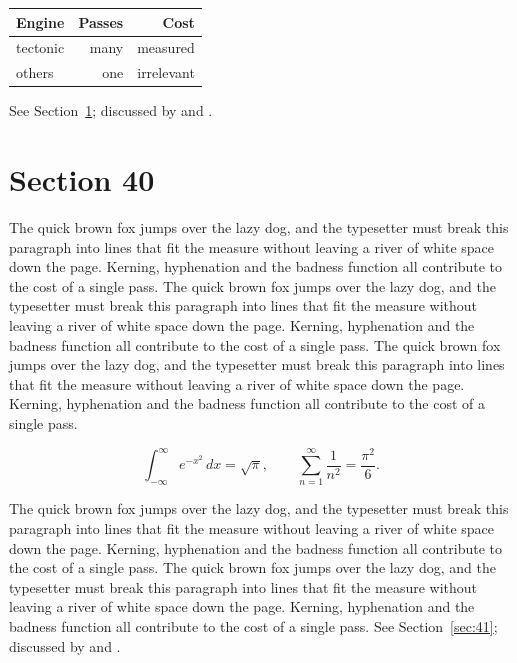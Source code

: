 \documentclass{article}
\begin{document}
\begin{center}
\begin{tabular}{lrr}
\toprule
Engine & Passes & Cost \\
\midrule
tectonic & many & measured \\
others & one & irrelevant \\
\bottomrule
\end{tabular}
\end{center}

See Section~\ref{sec:40}; discussed by \textcite{k5} and \textcite{l2}.
\section{Section 40}
\label{sec:40}
The quick brown fox jumps over the lazy dog, and the typesetter must break this paragraph into lines that fit the measure without leaving a river of white space down the page. Kerning, hyphenation and the badness function all contribute to the cost of a single pass. The quick brown fox jumps over the lazy dog, and the typesetter must break this paragraph into lines that fit the measure without leaving a river of white space down the page. Kerning, hyphenation and the badness function all contribute to the cost of a single pass. The quick brown fox jumps over the lazy dog, and the typesetter must break this paragraph into lines that fit the measure without leaving a river of white space down the page. Kerning, hyphenation and the badness function all contribute to the cost of a single pass. 

\begin{equation}\label{eq:40}
\int_{-\infty}^{\infty} e^{-x^{2}}\,dx = \sqrt{\pi}, \qquad
\sum_{n=1}^{\infty} \frac{1}{n^{2}} = \frac{\pi^{2}}{6}.
\end{equation}

The quick brown fox jumps over the lazy dog, and the typesetter must break this paragraph into lines that fit the measure without leaving a river of white space down the page. Kerning, hyphenation and the badness function all contribute to the cost of a single pass. The quick brown fox jumps over the lazy dog, and the typesetter must break this paragraph into lines that fit the measure without leaving a river of white space down the page. Kerning, hyphenation and the badness function all contribute to the cost of a single pass. 
See Section~\ref{sec:41}; discussed by \textcite{k1} and \textcite{l3}.
\end{document}
